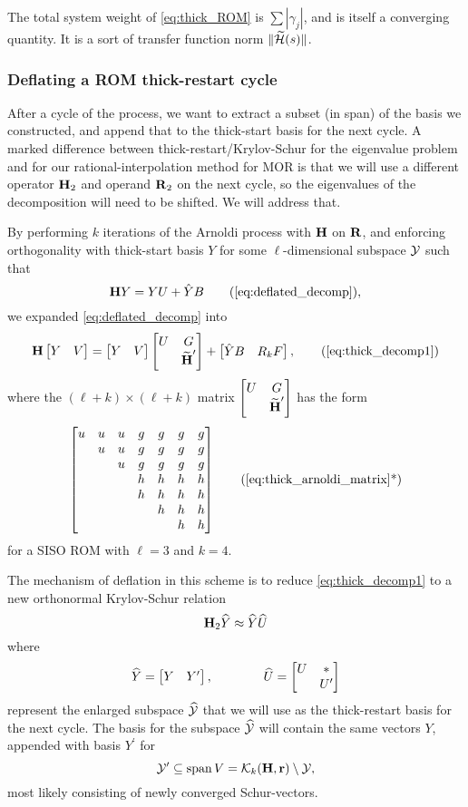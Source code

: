The total system weight of \eqref{eq:thick_ROM} is $\sum | \gamma_j |$, and is itself a converging quantity.  It is a sort of transfer function norm $\|\widetilde{\mathcal{H}}(s)\|$.

\subsubsection{Deflating a ROM thick-restart cycle}
After a cycle of the process, we want to extract a subset (in span) of the basis we constructed, and append that to the  thick-start basis for the next cycle.   A marked difference between thick-restart/Krylov-Schur for the eigenvalue problem and for our rational-interpolation method for MOR is that we will use a different operator $\textbf{\textup{H}}_2$ and operand $\textbf{\textup{R}}_2$ on the next cycle, so the eigenvalues of the decomposition will need to be shifted.   We will address that.
 
\medskip
By performing $k$ iterations of the Arnoldi process with $\textbf{\textup{H}}$ on $\textbf{\textup{R}}$, and enforcing orthogonality with thick-start basis $Y$ for some $\ell$-dimensional subspace $\mathcal{Y}$  such that
 \begin{equation}
\H Y = Y U +  \Yh B
\tag{\ref{eq:deflated_decomp}},
\end{equation}
we expanded \eqref{eq:deflated_decomp} into
\begin{equation}
\H \mat{Y &V} =  \mat{Y & V }
\mat{U & G \\ &\Himp^\prime} +  \mat{\Yh B  &  R_k F} ,
\tag{\ref{eq:thick_decomp1}}
\end{equation}
where the $(\ell+k)\times (\ell+k)$ matrix $\begin{bmatrix} U & G \\ &\widetilde{\textbf{\textup{H}}}^\prime\end{bmatrix}$ has the form 
\begin{equation}
\mat{u&u&u&g&g&g&g\\%
        &u&u&g&g&g&g\\
	  &&u&g&g&g&g\\
	 &&&h&h&h&h\\
	 &&&h&h&h&h\\
	 &&&&h&h&h\\
	&&&&&h&h
}
\tag{\ref{eq:thick_arnoldi_matrix}*}
\end{equation}
for a SISO ROM with $\ell=3$ and $k=4$.



The mechanism of deflation in this scheme is to reduce \eqref{eq:thick_decomp1} to a new orthonormal Krylov-Schur relation 
 \begin{equation}
\textbf{\textup{H}}_2 \widehat{Y} \approx \widehat{Y} \widehat{U}
\label{eq:deflated_decomp2}
\end{equation}
where 
\begin{equation}
\widehat{Y} = \begin{bmatrix} Y& Y^\prime\end{bmatrix}, \qquad \qquad
\widehat{U} = \begin{bmatrix} U & * \\  & U^\prime\end{bmatrix}
\end{equation}
 represent the enlarged subspace $\widehat{\mathcal{Y}}$ that we will use as the thick-restart basis for the next cycle. The basis for the  subspace $\widehat{\mathcal{Y}}$  will contain the same vectors $Y$, appended with basis $Y^\prime$ for 
\[
\mathcal{Y}^\prime\subseteq\operatorname*{span} V = \mathcal{K}_{k}({\textbf{\textup{H}}},{\textbf{\textup{r}}})\setminus \mathcal{Y},
\]
 most likely consisting of newly converged Schur-vectors. 

